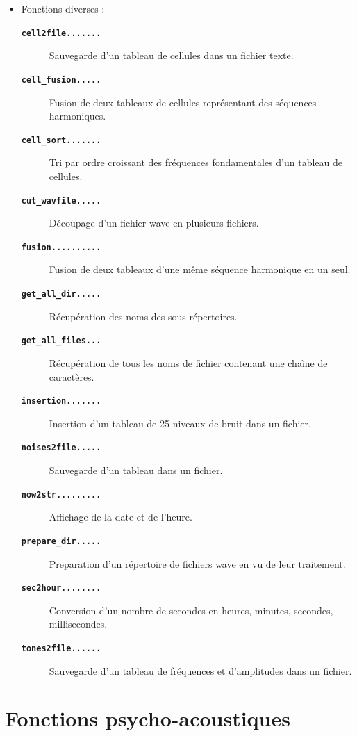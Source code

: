 \begin{itemize}
\bigskip
\item Fonctions diverses :
    \begin{description}
        \item[\textbf{\tt cell2file.......}]Sauvegarde d'un tableau de cellules dans un fichier texte.
        \item[\textbf{\tt cell\_fusion.....}]Fusion de deux tableaux de cellules repr{\'e}sentant des s{\'e}quences harmoniques.
        \item[\textbf{\tt cell\_sort.......}]Tri par ordre croissant des fr{\'e}quences fondamentales d'un tableau de cellules.
        \item[\textbf{\tt cut\_wavfile.....}]D{\'e}coupage d'un fichier wave en plusieurs fichiers.
        \item[\textbf{\tt fusion..........}]Fusion de deux tableaux d'une m{\^e}me s{\'e}quence harmonique en un seul.
        \item[\textbf{\tt get\_all\_dir.....}]R{\'e}cup{\'e}ration des noms des sous r{\'e}pertoires.
        \item[\textbf{\tt get\_all\_files...}]R{\'e}cup{\'e}ration de tous les noms de fichier contenant une cha{\^\i}ne de caract{\`e}res.
        \item[\textbf{\tt insertion.......}]Insertion d'un tableau de 25 niveaux de bruit dans un fichier.
        \item[\textbf{\tt noises2file.....}]Sauvegarde d'un tableau dans un fichier.
        \item[\textbf{\tt now2str.........}]Affichage de la date et de l'heure.
        \item[\textbf{\tt prepare\_dir.....}]Preparation d'un r{\'e}pertoire de fichiers wave en vu de leur traitement.
        \item[\textbf{\tt sec2hour........}]Conversion d'un nombre de secondes en heures, minutes, secondes, millisecondes.
        \item[\textbf{\tt tones2file......}]Sauvegarde d'un tableau de fr{\'e}quences et d'amplitudes dans un fichier.
    \end{description}
\end{itemize}

\newpage
\section{Fonctions psycho-acoustiques}
\label{secpsycho}

